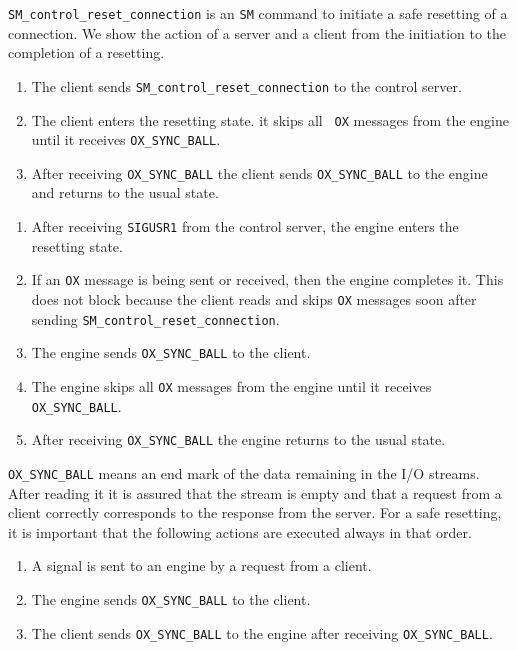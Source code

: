 {\tt SM\_control\_reset\_connection} is an {\tt SM} command to
initiate a safe resetting of a connection. We show the action of 
a server and a client from the initiation to the completion of
a resetting.

\noindent
{}

\begin{enumerate}
\item The client sends {\tt SM\_control\_reset\_connection} to the
control server.
\item The client enters the resetting state. it skips all {\tt
OX} messages from the engine until it receives {\tt OX\_SYNC\_BALL}.
\item After receiving {\tt OX\_SYNC\_BALL} the client sends 
{\tt OX\_SYNC\_BALL} to the engine and returns to the usual state.
\end{enumerate}

\noindent
{}

\begin{enumerate}
\item After receiving {\tt SIGUSR1} from the control server,
the engine enters the resetting state.
\item If an {\tt OX} message is being sent or received, then
the engine completes it. This does not block because
the client reads and skips {\tt OX} messages soon after sending
{\tt SM\_control\_reset\_connection}.
\item The engine sends {\tt OX\_SYNC\_BALL} to the client.
\item The engine skips all {\tt OX} messages from the engine until it
receives {\tt OX\_SYNC\_BALL}.
\item After receiving {\tt OX\_SYNC\_BALL} the engine returns to the
usual state.
\end{enumerate}

{\tt OX\_SYNC\_BALL} means an end mark of the data remaining in the
I/O streams. After reading it it is assured that the stream is empty
and that a request from a client correctly corresponds to the response
from the server.  For a safe resetting, it is important that the
following actions are executed always in that order.

\begin{enumerate}
\item A signal is sent to an engine by a request from a client.
\item The engine sends {\tt OX\_SYNC\_BALL} to the client.
\item The client sends {\tt OX\_SYNC\_BALL} to the engine after
receiving {\tt OX\_SYNC\_BALL}.
\end{enumerate}

